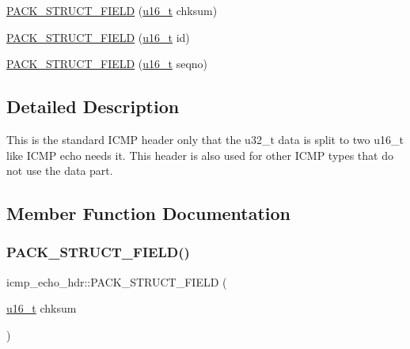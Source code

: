 \begin{DoxyCompactItemize}
\hyperlink{structicmp__echo__hdr_a5d1bdfcc4a8bdd58513ecbaea368c1ad}{P\+A\+C\+K\+\_\+\+S\+T\+R\+U\+C\+T\+\_\+\+F\+I\+E\+LD} (\hyperlink{group__compiler__abstraction_ga77570ac4fcab86864fa1916e55676da2}{u16\+\_\+t} chksum)
\item 
\hyperlink{structicmp__echo__hdr_a35dd6758d625e1542599175e65235362}{P\+A\+C\+K\+\_\+\+S\+T\+R\+U\+C\+T\+\_\+\+F\+I\+E\+LD} (\hyperlink{group__compiler__abstraction_ga77570ac4fcab86864fa1916e55676da2}{u16\+\_\+t} id)
\item 
\hyperlink{structicmp__echo__hdr_a2d2722057bc87fa0afb495ba6716eb57}{P\+A\+C\+K\+\_\+\+S\+T\+R\+U\+C\+T\+\_\+\+F\+I\+E\+LD} (\hyperlink{group__compiler__abstraction_ga77570ac4fcab86864fa1916e55676da2}{u16\+\_\+t} seqno)
\end{DoxyCompactItemize}


\subsection{Detailed Description}
This is the standard I\+C\+MP header only that the u32\+\_\+t data is split to two u16\+\_\+t like I\+C\+MP echo needs it. This header is also used for other I\+C\+MP types that do not use the data part. 

\subsection{Member Function Documentation}
\mbox{\label{structicmp__echo__hdr_a5d1bdfcc4a8bdd58513ecbaea368c1ad}} 
\subsubsection{\texorpdfstring{P\+A\+C\+K\+\_\+\+S\+T\+R\+U\+C\+T\+\_\+\+F\+I\+E\+L\+D()}{PACK\_STRUCT\_FIELD()}\hspace{0.1cm}{\footnotesize\ttfamily [1/6]}}
{\footnotesize\ttfamily icmp\+\_\+echo\+\_\+hdr\+::\+P\+A\+C\+K\+\_\+\+S\+T\+R\+U\+C\+T\+\_\+\+F\+I\+E\+LD (\begin{DoxyParamCaption}\item[{\hyperlink{group__compiler__abstraction_ga77570ac4fcab86864fa1916e55676da2}{u16\+\_\+t}}]{chksum }\end{DoxyParamCaption})}


